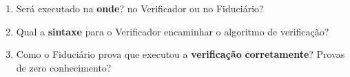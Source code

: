 \begin{enumerate}
    \item Será executado\textbf{ }na \textbf{onde}? no Verificador ou no Fiduciário?
    \item Qual a \textbf{sintaxe} para o Verificador encaminhar o algoritmo de verificação?
    \item Como o Fiduciário prova que executou a \textbf{verificação} \textbf{corretamente}? Provas de zero conhecimento? 
\end{enumerate}